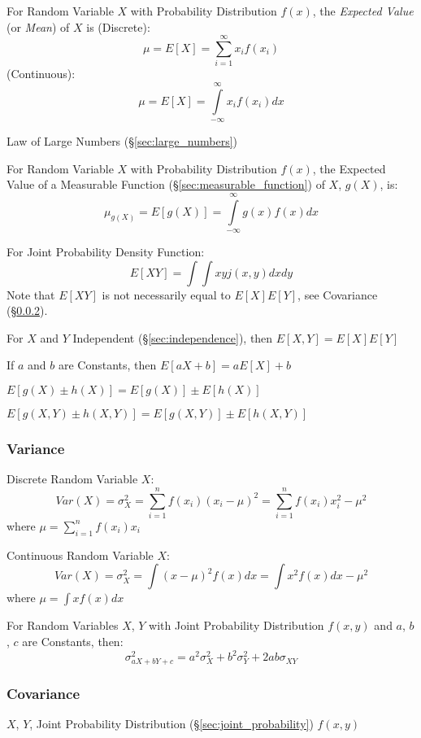 For Random Variable $X$ with Probability Distribution $f(x)$, the
\emph{Expected Value} (or \emph{Mean}) of $X$ is (Discrete):
\[
  \mu = E[X] = \sum_{i=1}^\infty x_i f(x_i)
\]
(Continuous):
\[
  \mu = E[X] = \int\limits_{-\infty}^{\infty} x_i f(x_i) dx
\]

Law of Large Numbers (\S\ref{sec:large_numbers})

For Random Variable $X$ with Probability Distribution $f(x)$, the
Expected Value of a Measurable Function
(\S\ref{sec:measurable_function}) of $X$, $g(X)$, is:
\[
  \mu_{g(X)} = E[g(X)] = \int\limits_{-\infty}^{\infty} g(x) f(x) dx
\]

For Joint Probability Density Function:
\[
  E[X Y] = \int\int x y j(x,y) dx dy
\]
\fist Note that $E[X Y]$ is not necessarily equal to $E[X]
E[Y]$, see Covariance (\S\ref{sec:covariance}).

For $X$ and $Y$ Independent (\S\ref{sec:independence}), then $E[X,Y] =
E[X] E[Y]$

If $a$ and $b$ are Constants, then $E[aX +b] = a E[X] + b$

$E [g(X) \pm h(X)] = E[g(X)] \pm E[h(X)]$

$E [g(X,Y) \pm h(X,Y)] = E[g(X,Y)] \pm E[h(X,Y)]$



\subsubsection{Variance}\label{sec:variance}

Discrete Random Variable $X$:
\[
  Var(X) = \sigma_X^2 = \sum_{i=1}^n f(x_i) (x_i - \mu)^2 = \sum_{i=1}^n
  f(x_i) x_i^2 - \mu^2
\]
where $\mu = \sum_{i=1}^n f(x_i) x_i$

Continuous Random Variable $X$:
\[
  Var(X) = \sigma_X^2 = \int (x - \mu)^2 f(x) dx = \int x^2 f(x) dx -
  \mu^2
\]
where $\mu = \int x f(x) dx$

For Random Variables $X$, $Y$ with Joint Probability Distribution
$f(x,y)$ and $a$, $b$, $c$ are Constants, then:
\[
  \sigma^2_{a X + b Y + c} = a^2 \sigma^2_X + b^2 \sigma^2_Y + 2ab
  \sigma_{X Y}
\]



\subsubsection{Covariance}\label{sec:covariance}

$X$, $Y$, Joint Probability Distribution
(\S\ref{sec:joint_probability}) $f(x,y)$

